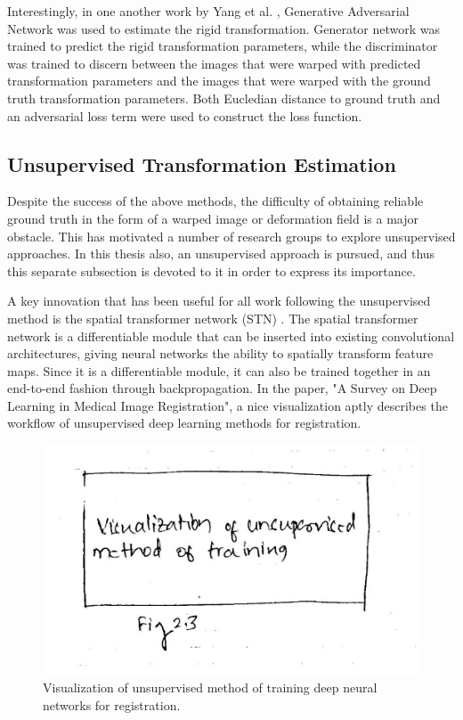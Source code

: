 \documentclass{report}
\begin{document}
	Interestingly, in one another work by Yang et al. \cite{https://doi.org/10.48550/arxiv.1804.11024}, Generative Adversarial Network was used to estimate the rigid transformation. Generator network was trained to predict the rigid transformation parameters, while the discriminator was trained to discern between the images that were warped with predicted transformation parameters and the images that were warped with the ground truth transformation parameters. Both Eucledian distance to ground truth and an adversarial loss term were used to construct the loss function.
	
	\subsection{Unsupervised Transformation Estimation}
	Despite the success of the above methods, the difficulty of obtaining reliable ground truth in the form of a warped image or deformation field is a major obstacle. This has motivated a number of research groups to explore unsupervised approaches. In this thesis also, an unsupervised approach is pursued, and thus this separate subsection is devoted to it in order to express its importance.
	
	A key innovation that has been useful for all work following the unsupervised method is the spatial transformer network (STN) \cite{NIPS2015_33ceb07b}. The spatial transformer network is a differentiable module that can be inserted into existing convolutional architectures, giving neural networks the ability to spatially transform feature maps. Since it is a differentiable module, it can also be trained together in an end-to-end fashion through backpropagation. In the paper, "A Survey on Deep Learning in Medical Image Registration", \cite{Haskins_2020} a nice visualization aptly describes the workflow of unsupervised deep learning methods for registration.
	
	\begin{figure}[H]
		\centering
		\includegraphics[width=0.7\columnwidth]{resources/chapter2/figure2.png}
		\caption{Visualization of unsupervised method of training deep neural networks for registration. \cite{Haskins_2020}}
		\label{fig:unsupervised_visualization}
	\end{figure}
	
\end{document}
